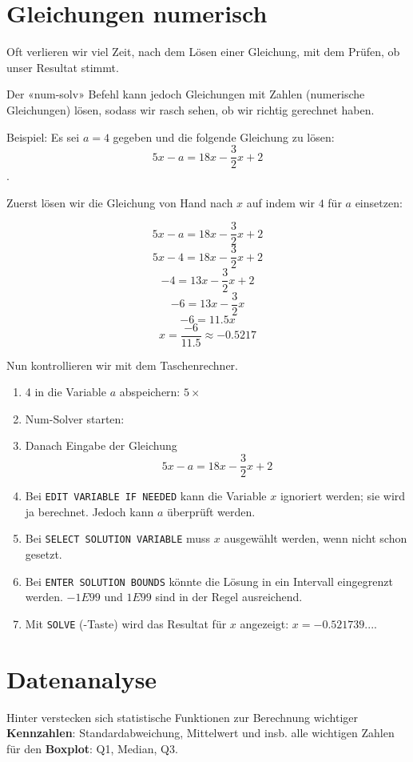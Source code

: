 \newpage

\section{Gleichungen numerisch}\label{numGleichungen}
Oft verlieren wir viel Zeit, nach dem Lösen einer Gleichung, mit dem Prüfen, ob unser Resultat stimmt.

Der «num-solv» Befehl kann jedoch Gleichungen mit Zahlen (numerische Gleichungen) lösen, sodass wir rasch sehen, ob wir richtig gerechnet haben.

Beispiel: Es sei $a=4$ gegeben und die folgende Gleichung zu lösen: $$5x-a = 18x-\frac32x + 2$$.

Zuerst lösen wir die Gleichung von Hand nach $x$ auf indem wir $4$ für $a$ einsetzen:

$$5x-a = 18x -\frac32x + 2$$
$$5x-4 = 18x -\frac32x + 2$$
$$  -4 = 13x -\frac32x + 2$$
$$  -6 = 13x -\frac32x$$
$$  -6 = 11.5x$$
$$ x = \frac{-6}{11.5}\approx{-0.5217}$$

Nun kontrollieren wir mit dem Taschenrechner.

\begin{enumerate}
\item 4 in die Variable $a$ abspeichern:   $5\times$
\item Num-Solver starten:  
\item Danach Eingabe der Gleichung
$$5x-a = 18x -\frac32x + 2$$
\item Bei \texttt{EDIT VARIABLE IF NEEDED} kann die Variable $x$ ignoriert werden; sie wird ja berechnet. Jedoch kann $a$ überprüft werden.
\item Bei \texttt{SELECT SOLUTION VARIABLE} muss $x$ ausgewählt werden, wenn nicht schon gesetzt.
\item Bei \texttt{ENTER SOLUTION BOUNDS} könnte die Lösung in ein Intervall eingegrenzt werden. $-1E99$ und $1E99$ sind in der Regel ausreichend.
\item Mit \texttt{SOLVE} (-Taste) wird das Resultat für $x$ angezeigt: $x = -0.521739...$.
\end{enumerate}




\section{Datenanalyse}\label{daan}
Hinter  verstecken sich statistische
Funktionen zur Berechnung wichtiger \textbf{Kennzahlen}:
Standardabweichung, Mittelwert und insb. alle wichtigen Zahlen für
den \textbf{Boxplot}: Q1, Median, Q3.

